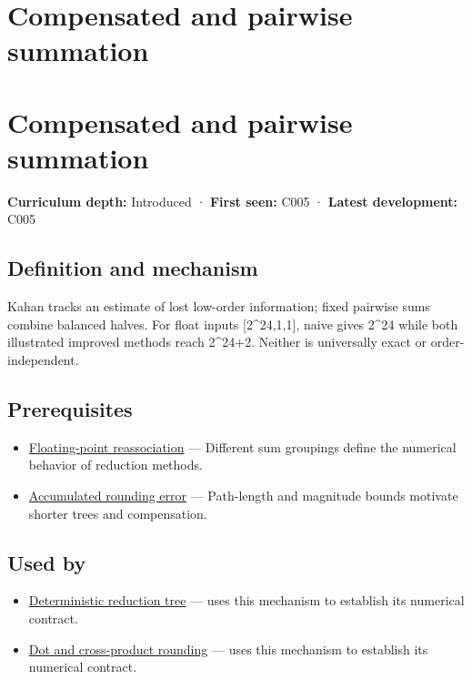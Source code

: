 \hypertarget{appendix-df318da57389}{}
\section*{Compensated and pairwise summation}
\section{Compensated and pairwise summation}\label{appendix-df318da57389-compensated-and-pairwise-summation}

\textbf{Curriculum depth:} Introduced · \textbf{First seen:} C005 · \textbf{Latest development:} C005

\subsection{Definition and mechanism}\label{appendix-df318da57389-definition-and-mechanism}

Kahan tracks an estimate of lost low-order information; fixed pairwise sums combine balanced halves. For float inputs {[}2\^{}24,1,1{]}, naive gives 2\^{}24 while both illustrated improved methods reach 2\^{}24+2. Neither is universally exact or order-independent.

\subsection{Prerequisites}\label{appendix-df318da57389-prerequisites}

\begin{itemize}
\tightlist
\item
  \hyperref[appendix-c2ac4a84c283]{Floating-point reassociation} --- Different sum groupings define the numerical behavior of reduction methods.
\item
  \hyperref[appendix-f82e270791c8]{Accumulated rounding error} --- Path-length and magnitude bounds motivate shorter trees and compensation.
\end{itemize}

\subsection{Used by}\label{appendix-df318da57389-used-by}

\begin{itemize}
\tightlist
\item
  \hyperref[appendix-4c8e0238e7ee]{Deterministic reduction tree} --- uses this mechanism to establish its numerical contract.
\item
  \hyperref[appendix-5aef4f13483a]{Dot and cross-product rounding} --- uses this mechanism to establish its numerical contract.
\end{itemize}

